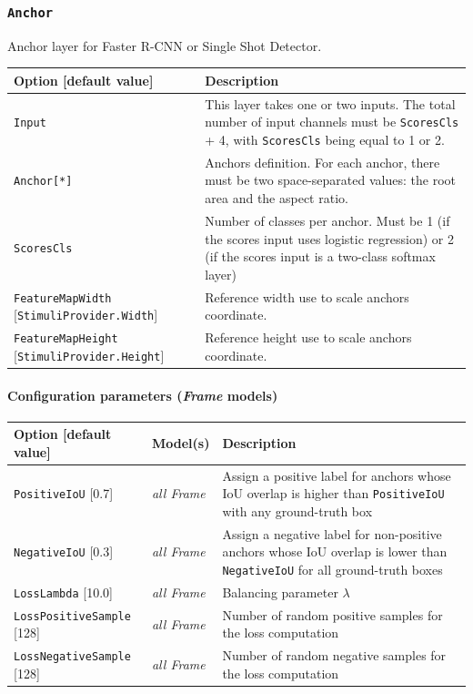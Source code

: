 \documentclass[a4paper,11pt,oneside]{article}
\begin{document}
\subsubsection{\texorpdfstring{%
\lstinline[basicstyle=\ttfamily\bfseries]!Anchor!}{Anchor}}
Anchor layer for Faster R-CNN or Single Shot Detector.

\begin{center}
 \begin{longtable}{| p{5cm} | p{10cm} | }
 \hline
 Option [default value] & Description\\
 \hline\hline
  \cellcolor{requiredcolor}\lstinline!Input! & This layer takes one or two
  inputs. The total number of input channels must be \lstinline!ScoresCls! + 4,
  with \lstinline!ScoresCls! being equal to 1 or 2. \\
  \cellcolor{requiredcolor}\lstinline!Anchor[*]! & Anchors definition. For each
  anchor, there must be two space-separated values: the root area and the aspect
   ratio. \\
  \lstinline!ScoresCls! & Number of classes per anchor. Must be 1 (if the scores
  input uses logistic regression) or 2 (if the scores input is a two-class
  softmax layer) \\
  \lstinline!FeatureMapWidth! [\lstinline!StimuliProvider.Width!] & Reference width use
  to scale anchors coordinate.\\
  \lstinline!FeatureMapHeight! [\lstinline!StimuliProvider.Height!] & Reference height use
  to scale anchors coordinate.\\
 \hline
\end{longtable}
\end{center}

\paragraph{Configuration parameters (\emph{Frame} models)}

\begin{center}
 \begin{longtable}{| p{4cm} | p{3cm} | p{9cm} | }
 \hline
 Option [default value] & Model(s) & Description\\
 \hline\hline
  \lstinline!PositiveIoU! [0.7] & \emph{all Frame} &  Assign a positive label
  for anchors whose IoU overlap is higher than \lstinline!PositiveIoU! with any
   ground-truth box \\
  \lstinline!NegativeIoU! [0.3] & \emph{all Frame} & Assign a negative label
  for non-positive anchors whose IoU overlap is lower than
  \lstinline!NegativeIoU! for all ground-truth boxes \\
  \lstinline!LossLambda! [10.0] & \emph{all Frame} & Balancing parameter $\lambda$ \\
  \lstinline!LossPositiveSample! [128] & \emph{all Frame} & Number of random
  positive samples for the loss computation \\
  \lstinline!LossNegativeSample! [128] & \emph{all Frame} & Number of random
  negative samples for the loss computation \\
 \hline
\end{longtable}
\end{center}
\end{document}
